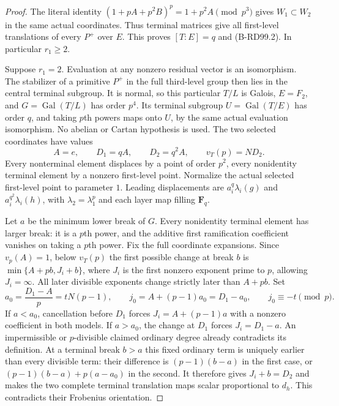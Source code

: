 \begin{proof}
The literal identity $(1+pA+p^2B)^p=1+p^2A\pmod{p^3}$
gives $W_1\subset W_2$ in the same actual coordinates.
Thus terminal matrices give all first-level translations of
every $P^+$ over $E$. This proves $[T:E]=q$ and (B-RD99.2).
In particular $r_1\ge2$.

Suppose $r_1=2$. Evaluation at any nonzero residual vector
is an isomorphism. The stabilizer of a primitive $P^+$ in
the full third-level group then lies in the central terminal
subgroup. It is normal, so this particular $T/L$ is Galois,
$E=F_2$, and $G=\operatorname{Gal}(T/L)$ has order $p^4$.
Its terminal subgroup $U=\operatorname{Gal}(T/E)$ has order
$q$, and taking $p$th powers maps onto $U$, by the same actual
evaluation isomorphism. No abelian or Cartan hypothesis is used.
The two selected coordinates have values
\[
 A=e,\qquad D_1=qA,\qquad D_2=q^2A,\qquad v_T(p)=ND_2.
                                                        \tag{B-RD99.6}
\]
Every nonterminal element displaces by a point of order $p^2$,
every nonidentity terminal element by a nonzero first-level
point. Normalize the actual selected first-level point to
parameter $1$. Leading displacements are
$a_i^q\lambda_i(g)$ and $a_i^{q^2}\lambda_i(h)$, with
$\lambda_2=\lambda_1^p$ and each layer map filling $\mathbf F_q$.

Let $a$ be the minimum lower break of $G$. Every nonidentity
terminal element has larger break: it is a $p$th power, and
the additive first ramification coefficient vanishes on taking
a $p$th power. Fix the full coordinate expansions. Since
$v_p(A)=1$, below $v_T(p)$ the first possible change at break
$b$ is $\min\{A+pb,J_i+b\}$, where $J_i$ is the first
nonzero exponent prime to $p$, allowing $J_i=\infty$.
All later divisible exponents change strictly later than
$A+pb$. Set
\[
 a_0=\frac{D_1-A}{p}=tN(p-1),\qquad
 j_0=A+(p-1)a_0=D_1-a_0,\qquad j_0\equiv-t\pmod p.
                                                        \tag{B-RD99.7}
\]
If $a<a_0$, cancellation before $D_1$ forces
$J_i=A+(p-1)a$ with a nonzero coefficient in both models.
If $a>a_0$, the change at $D_1$ forces $J_i=D_1-a$.
An impermissible or $p$-divisible claimed ordinary degree
already contradicts its definition. At a terminal break $b>a$
this fixed ordinary term is uniquely earlier than every
divisible term: their difference is $(p-1)(b-a)$ in the
first case, or $(p-1)(b-a)+p(a-a_0)$ in the second.
It therefore gives $J_i+b=D_2$ and makes the two complete
terminal translation maps scalar proportional to $d_h$.
This contradicts their Frobenius orientation.


\end{proof}
